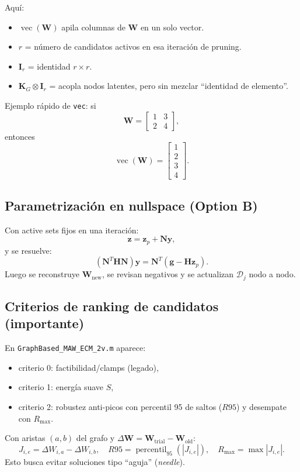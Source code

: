 \documentclass[11pt,a4paper]{article}
\newcommand{\W}{\bm W}
\newcommand{\K}{\bm K}
\begin{document}
Aqu\'i:
\begin{itemize}[leftmargin=0.8cm]
    \item $\operatorname{vec}(\W)$ apila columnas de $\W$ en un solo vector.
    \item $r$ = n\'umero de candidatos activos en esa iteraci\'on de pruning.
    \item $\bm I_r$ = identidad $r\times r$.
    \item $\K_G\otimes \bm I_r$ = acopla nodos latentes, pero sin mezclar ``identidad de elemento''.
\end{itemize}

Ejemplo r\'apido de \texttt{vec}: si
\[
\W=
\begin{bmatrix}
1 & 3\\
2 & 4
\end{bmatrix},
\]
entonces
\[
\operatorname{vec}(\W)=
\begin{bmatrix}
1\\2\\3\\4
\end{bmatrix}.
\]

\subsection{Parametrizaci\'on en nullspace (Option B)}
Con active sets fijos en una iteraci\'on:
\[
\bm z = \bm z_p + \bm N \bm y,
\]
y se resuelve:
\[
(\bm N^T\bm H\bm N)\bm y = \bm N^T(\bm g-\bm H\bm z_p).
\]
Luego se reconstruye $\W_{\text{new}}$, se revisan negativos y se actualizan
$\mathcal D_j$ nodo a nodo.

\subsection{Criterios de ranking de candidatos (importante)}
En \texttt{GraphBased\_MAW\_ECM\_2v.m} aparece:
\begin{itemize}[leftmargin=0.8cm]
    \item criterio 0: factibilidad/clamps (legado),
    \item criterio 1: energ\'ia suave $S$,
    \item criterio 2: robustez anti-picos con percentil 95 de saltos ($R95$) y
    desempate con $R_{\max}$.
\end{itemize}

Con aristas $(a,b)$ del grafo y
$\Delta\W=\W_{\text{trial}}-\W_{\text{old}}$:
\[
J_{i,e}=\Delta W_{i,a}-\Delta W_{i,b},
\quad
R95=\operatorname{percentil}_{95}(|J_{i,e}|),
\quad
R_{\max}=\max |J_{i,e}|.
\]
Esto busca evitar soluciones tipo ``aguja'' (\emph{needle}).
\end{document}
